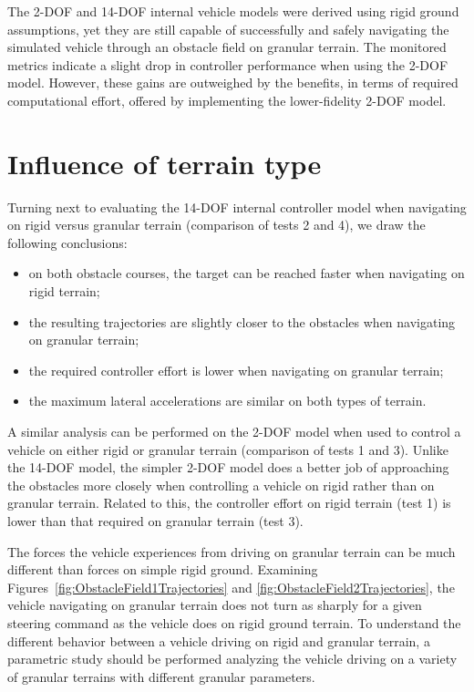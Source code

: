 \documentclass[12pt,onecolumn]{report}
\begin{document}
The 2-DOF and 14-DOF internal vehicle models were derived using rigid ground assumptions, yet they are still capable of successfully and safely navigating the simulated vehicle through an obstacle field on granular terrain. The monitored metrics indicate a slight drop in controller performance when using the 2-DOF model. However, these gains are outweighed by the benefits, in terms of required computational effort, offered by implementing the lower-fidelity 2-DOF model. 

\section{Influence of terrain type}

Turning next to evaluating the 14-DOF internal controller model when navigating on rigid versus granular terrain (comparison of tests 2 and 4), we draw the following conclusions:
\begin{itemize}
\item on both obstacle courses, the target can be reached faster when navigating on rigid terrain;
\item the resulting trajectories are slightly closer to the obstacles when navigating on granular terrain;
\item the required controller effort is lower when navigating on granular terrain;
\item the maximum lateral accelerations are similar on both types of terrain.
\end{itemize}

A similar analysis can be performed on the 2-DOF model when used to control a vehicle on either rigid or granular terrain (comparison of tests 1 and 3). Unlike the 14-DOF model, the simpler 2-DOF model does a better job of approaching the obstacles more closely when controlling a vehicle on rigid rather than on granular terrain. Related to this, the controller effort on rigid terrain (test 1) is lower than that required on granular terrain (test 3). 


The forces the vehicle experiences from driving on granular terrain can be much different than forces on simple rigid ground. Examining Figures~\ref{fig:ObstacleField1Trajectories} and \ref{fig:ObstacleField2Trajectories}, the vehicle navigating on granular terrain does not turn as sharply for a given steering command as the vehicle does on rigid ground terrain. To understand the different behavior between a vehicle driving on rigid and granular terrain, a parametric study should be performed analyzing the vehicle driving on a variety of granular terrains with different granular parameters. 
\end{document}
